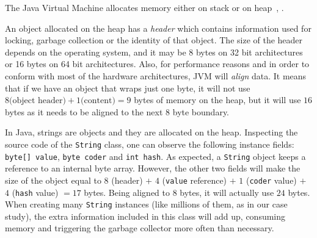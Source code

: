 \documentclass[a4paper,twoside]{article}
\begin{document}
The Java Virtual Machine allocates memory either on stack or on heap~\cite{lindholm:2014}, \cite{gosling:2014}.

An object allocated on the heap has a {\textit{header}} which contains information used for locking, garbage collection or the identity of that object.
The size of the header depends on the operating system, and it may be 8 bytes on 32 bit architectures or 16 bytes on 64 bit architectures.
Also, for performance reasons and in order to conform with most of the hardware architectures, JVM will {\textit{align}} data.
It means that if we have an object that wraps just one byte, it will not use $8 \text{(object header)} + 1 \text{(content)} = 9 $ bytes of memory on the heap, but it will use $16$ bytes as it needs to be aligned to the next $8$ byte boundary.

In Java, strings are objects and they are allocated on the heap.
Inspecting the source code of the \texttt{String} class, one can observe the following instance fields:
{\tt byte[] value}, {\tt byte coder} and  {\tt int hash}.
As expected, a \texttt{String} object keeps a reference to an internal byte array.
However, the other two fields will make the size of the object equal to $8$ (header) $+$ $4$ (\texttt{value} reference) $+$ $1$  (\texttt{coder} value) $+$ $4$ (\texttt{hash} value) $= 17$ bytes.
Being aligned to $8$ bytes, it will actually use $24$ bytes.
When creating many \texttt{String} instances (like millions of them, as in our case study), the extra information included in this class will add up, consuming memory and  triggering the garbage collector more often than necessary. 
\end{document}
